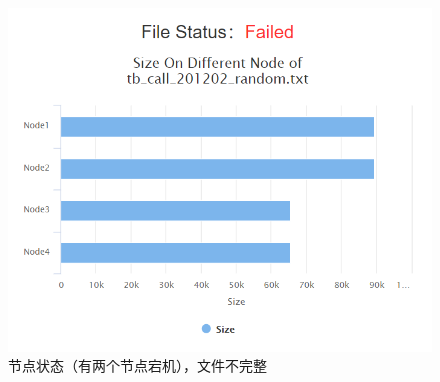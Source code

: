 \documentclass[12pt,a4paper]{article}
\begin{document}
\begin{figure}[htb]
\centering
\includegraphics[width=14cm]{node_5}
\caption{节点状态（有两个节点宕机），文件不完整 \label{node_5}}
\end{figure}

\clearpage
\end{document}
